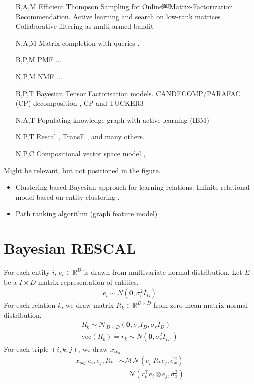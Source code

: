 \documentclass{article}
\begin{document}
\begin{itemize}
\item [B,A,M] Efficient Thompson Sampling for Online￼Matrix-Factorization Recommendation\cite{kawale2015efficient}. Active learning and search on low-rank matrices \cite{sutherland2013active}. Collaborative filtering as multi armed bandit \cite{guillou2015collaborative}
\item [N,A,M] Matrix completion with queries \cite{ruchansky2015matrix}.
\item [B,P,M] PMF \cite{mnih2007probabilistic} ...
\item [N,P,M] NMF\cite{lee1999learning} ...
\item [B,P,T] Bayesian Tensor Factorisation models. CANDECOMP/PARAFAC (CP) decomposition \cite{xiong2010temporal,schmidt2009probabilistic}, CP and TUCKER3 \cite{yilmaz2012algorithms}
\item [N,A,T] Populating knowledge graph with active learning (IBM) \cite{kajino2015active}
\item [N,P,T] Rescal \cite{nickel2011three}, TransE \cite{bordes2013translating}, and many others.
\item [N,P,C] Compositional vector space model \cite{Neelakantan2015}, 
\end{itemize}

Might be relevant, but not positioned in the figure.
\begin{itemize}
\item Clustering based Bayesian approach for learning relations: Infinite relational model based on entity clustering \cite{kemp2006learning}.
\item Path ranking algorithm (graph feature model) \cite{Lao2010}
\end{itemize}

\section{Bayesian RESCAL}

For each entity $i$, $e_i \in \mathbb{R}^{D}$ is drawn from multivariate-normal distribution. Let $E$ be a $I \times D$ matrix representation of entities.
\begin{align}
\label{eqn:entity_gen}
e_i \sim {N}(\mathbf{0}, \sigma_e^2{I}_D)
\end{align}
For each relation $k$, we draw matrix $R_k \in \mathbb{R}^{D\times D}$ from zero-mean matrix normal distribution.
\begin{align}
\label{eqn:relation_gen}
R_k \sim \mathcal{N}_{D \times D}(\mathbf{0}, \sigma_r{I}_D, \sigma_r{I}_D) \\
\text{vec}(R_k) = r_k \sim N(\mathbf{0}, \sigma_r^2 I_{D^2})
\end{align}
For each triple $(i,k,j)$, we draw $x_{ikj}$
\begin{align}
\label{eqn:triple_gen}
x_{ikj} |e_i, e_j, R_k &\sim \mathcal{MN}(e_i^{\top} R_k e_j, \sigma_x^2)\\
& = \mathcal{N}(r_k^{\top} e_i \otimes e_j, \sigma_x^2)
\end{align}
\end{document}
